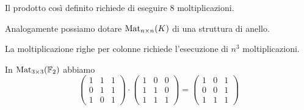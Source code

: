 \documentclass[../main.tex]{subfiles}
\begin{document}
Il prodotto così definito richiede di eseguire 8 moltiplicazioni.

Analogamente possiamo dotare $\operatorname{Mat}_{n \times n}(K)$ di una struttura di anello.

La moltiplicazione righe per colonne richiede l'esecuzione di $n^3$ moltiplicazioni.

\begin{example}
    In $\operatorname{Mat}_{3 \times 3}(\mathbb{F}_2)$ abbiamo
    \begin{equation*}
        \begin{pmatrix}
            1 & 1 & 1 \\
            0 & 1 & 1 \\
            1 & 0 & 1
        \end{pmatrix}
        \cdot
        \begin{pmatrix}
            1 & 0 & 0 \\
            1 & 1 & 0 \\
            1 & 1 & 1
        \end{pmatrix}
        =
        \begin{pmatrix}
            1 & 0 & 1 \\
            0 & 0 & 1 \\
            1 & 1 & 1
        \end{pmatrix}
    \end{equation*}
\end{example}
\end{document}
